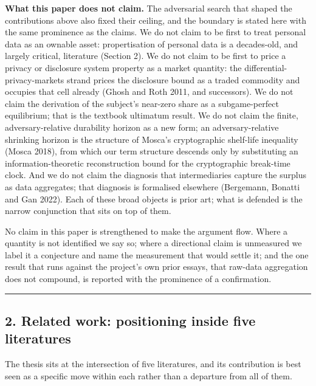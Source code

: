 \documentclass[
  11pt,
]{article}
\begin{document}
\textbf{What this paper does not claim.} The adversarial search that
shaped the contributions above also fixed their ceiling, and the
boundary is stated here with the same prominence as the claims. We do
not claim to be first to treat personal data as an ownable asset:
propertisation of personal data is a decades-old, and largely critical,
literature (Section 2). We do not claim to be first to price a privacy
or disclosure system property as a market quantity: the
differential-privacy-markets strand prices the disclosure bound as a
traded commodity and occupies that cell already (Ghosh and Roth 2011,
and successors). We do not claim the derivation of the subject's
near-zero share as a subgame-perfect equilibrium; that is the textbook
ultimatum result. We do not claim the finite, adversary-relative
durability horizon as a new form; an adversary-relative shrinking
horizon is the structure of Mosca's cryptographic shelf-life inequality
(Mosca 2018), from which our term structure descends only by
substituting an information-theoretic reconstruction bound for the
cryptographic break-time clock. And we do not claim the diagnosis that
intermediaries capture the surplus as data aggregates; that diagnosis is
formalised elsewhere (Bergemann, Bonatti and Gan 2022). Each of these
broad objects is prior art; what is defended is the narrow conjunction
that sits on top of them.

No claim in this paper is strengthened to make the argument flow. Where
a quantity is not identified we say so; where a directional claim is
unmeasured we label it a conjecture and name the measurement that would
settle it; and the one result that runs against the project's own prior
essays, that raw-data aggregation does not compound, is reported with
the prominence of a confirmation.

\begin{center}\rule{0.5\linewidth}{0.5pt}\end{center}

\subsection{2. Related work: positioning inside five
literatures}\label{related-work-positioning-inside-five-literatures}

The thesis sits at the intersection of five literatures, and its
contribution is best seen as a specific move within each rather than a
departure from all of them.
\end{document}
